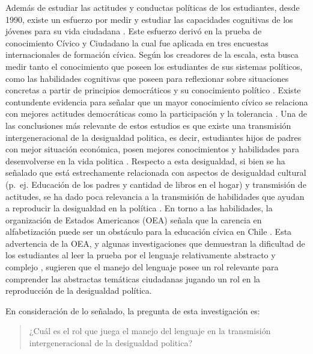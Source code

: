 \documentclass[12pt,twoside]{templates/facsothesis}
\begin{document}
Además de estudiar las actitudes y conductas políticas de los estudiantes, desde 1990, existe un esfuerzo por medir y estudiar las capacidades cognitivas de los jóvenes para su vida ciudadana \citep{torney-purta_estudio_2015}. Este esfuerzo derivó en la prueba de conocimiento Cívico y Ciudadano la cual fue aplicada en tres encuestas internacionales de formación cívica. Según los creadores de la escala, esta busca medir tanto el conocimiento que poseen los estudiantes de sus sistemas políticos, como las habilidades cognitivas que poseen para reflexionar sobre situaciones concretas a partir de principios democráticos y su conocimiento político \citep{schulz_Initial_2010}. Existe contundente evidencia para señalar que un mayor conocimiento cívico se relaciona con mejores actitudes democráticas como la participación y la tolerancia \citep{schulz_Initial_2010, galston_Civic_2007, miranda_Political_2018}. Una de las conclusiones más relevante de estos estudios es que existe una transmisión intergeneracional de la desigualdad politica, es decir, estudiantes hijos de padres con mejor situación económica, posen mejores conocimientos y habilidades para desenvolverse en la vida politica \citep{schulz_Initial_2010, miranda_Desigualdad_2015}. Respecto a esta desigualdad, si bien se ha señalado que está estrechamente relacionada con aspectos de desigualdad cultural (p.~ej. Educación de los padres y cantidad de libros en el hogar) y transmisión de actitudes, se ha dado poca relevancia a la transmisión de habilidades que ayudan a reproducir la desigualdad en la política \citep{brady_Political_2015}. En torno a las habilidades, la organización de Estados Americanos (OEA) señala que la carencia en alfabetización puede ser un obstáculo para la educación cívica en Chile \citep{torney-purta_estudio_2015}. Esta advertencia de la OEA, y algunas investigaciones que demuestran la dificultad de los estudiantes al leer la prueba por el lenguaje relativamente abstracto y complejo \citep{zhang_Understanding_2015, arensmeier_Swedish_2015}, sugieren que el manejo del lenguaje posee un rol relevante para comprender las abstractas temáticas ciudadanas jugando un rol en la reproducción de la desigualdad política.

En consideración de lo señalado, la pregunta de esta investigación es:

\begin{quote}
¿Cuál es el rol que juega el manejo del lenguaje en la transmisión intergeneracional de la desigualdad politica?
\end{quote}
\end{document}
